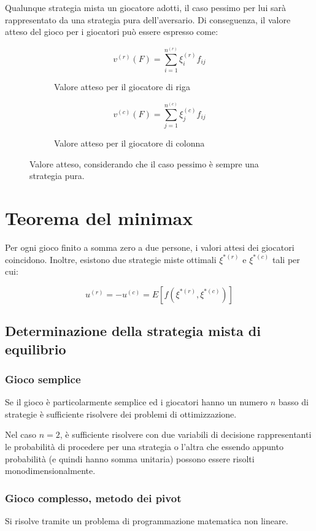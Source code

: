 \documentclass[\main/main.tex]{subfiles}
\begin{document}
\begin{theorem}
  Qualunque strategia mista un giocatore adotti, il caso pessimo per lui sarà rappresentato da una strategia pura dell'aversario. Di conseguenza, il valore atteso del gioco per i giocatori può essere espresso come:
  \begin{figure}
    \begin{subfigure}{0.49\textwidth}
      \[
        v^{(r)}(F) = \sum_{i=1}^{n^{(r)}} \xi^{(r)}_i f_{ij}
      \]
      \caption{Valore atteso per il giocatore di riga}
    \end{subfigure}
    \begin{subfigure}{0.49\textwidth}
      \[
        v^{(c)}(F) = \sum_{j=1}^{n^{(c)}} \xi^{(c)}_j f_{ij}
      \]
      \caption{Valore atteso per il giocatore di colonna}
    \end{subfigure}
    \caption{Valore atteso, considerando che il caso pessimo è sempre una strategia pura.}
  \end{figure}
\end{theorem}

\section{Teorema del minimax}
\begin{theorem}
  Per ogni gioco finito a somma zero a due persone, i valori attesi dei giocatori coincidono. Inoltre, esistono due strategie miste ottimali $\xi^{*(r)}$ e $\xi^{*(c)}$ tali per cui:

  \[
    u^{(r)} = -u^{(c)} = E\left[ f(\xi^{*(r)}, \xi^{*(c)}) \right]
  \]
\end{theorem}

\subsection{Determinazione della strategia mista di equilibrio}
\subsubsection{Gioco semplice}
Se il gioco è particolarmente semplice ed i giocatori hanno un numero $n$ basso di strategie è sufficiente risolvere dei problemi di ottimizzazione.

Nel caso $n=2$, è sufficiente risolvere con due variabili di decisione rappresentanti le probabilità di procedere per una strategia o l'altra che essendo appunto probabilità (e quindi hanno somma unitaria) possono essere risolti monodimensionalmente.

\subsubsection{Gioco complesso, metodo dei pivot}
Si risolve tramite un problema di programmazione matematica non lineare.
\end{document}

